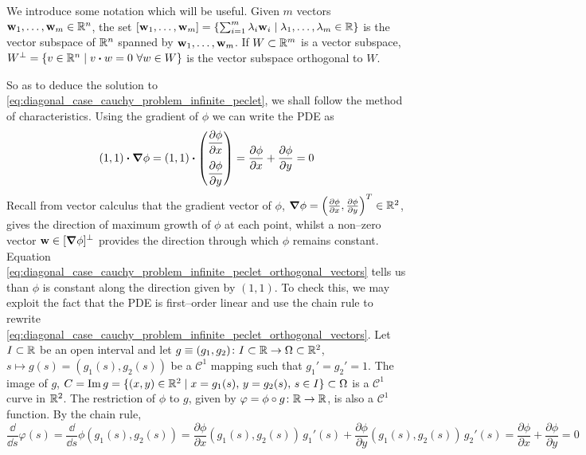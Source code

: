 We introduce some notation which will be useful. Given $m$ vectors $\vb{w}_1, \ldots, \vb{w}_m \in \mathbb{R}^n$, the set $[\vb{w}_1, \ldots, \vb{w}_m] = \{ \sum_{i=1}^m \lambda_i \vb{w}_i \mid \lambda_1, \ldots, \lambda_m \in \mathbb{R} \}$ is the vector subspace of $\mathbb{R}^n$ spanned by $\vb{w}_1, \ldots, \vb{w}_m$. If $W \subset \mathbb{R}^m$ is a vector subspace, $W^\perp = \{ v \in \real^n \mid v \vdot w = 0 \ \forall w \in W \}$ is the vector subspace orthogonal to $W$.

So as to deduce the solution to \eqref{eq:diagonal_case_cauchy_problem_infinite_peclet}, we shall follow the method of characteristics. Using the gradient of $\phi$ we can write the PDE as
\begin{equation} \label{eq:diagonal_case_cauchy_problem_infinite_peclet_orthogonal_vectors}
	\left( 1, 1 \right)
	\vdot
	\grad{\phi} = 
	\left( 1, 1 \right)
	\vdot
	\begin{pmatrix}
	\displaystyle\pdv{\phi}{x} \\[10pt] \displaystyle\pdv{\phi}{y}
	\end{pmatrix} = 
	\pdv{\phi}{x} + \pdv{\phi}{y} = 0
\end{equation}
Recall from vector calculus that the gradient vector of $\phi$, $\grad{\phi} = \left( \pdv{\phi}{x}, \pdv{\phi}{y} \right)^T \in \mathbb{R}^2$, gives the direction of maximum growth of $\phi$ at each point, whilst a non--zero vector $\vb{w} \in [\grad{\phi}]^\perp$ provides the direction through which $\phi$ remains constant. Equation \eqref{eq:diagonal_case_cauchy_problem_infinite_peclet_orthogonal_vectors} tells us than $\phi$ is constant along the direction given by $(1, 1)$. To check this, we may exploit the fact that the PDE is first--order linear and use the chain rule to rewrite \eqref{eq:diagonal_case_cauchy_problem_infinite_peclet_orthogonal_vectors}. Let $I \subset \mathbb{R}$ be an open interval and let $g \equiv (g_1, g_2) \colon I \subset \mathbb{R} \rightarrow \Omega \subset \mathbb{R}^2$, $s \mapsto g(s) = (g_1(s), g_2(s))$ be a $\mathcal{C}^1$ mapping such that $g_1' = g_2' = 1$. The image of $g$, $C = \operatorname{Im}{g} = \{ (x, y) \in \mathbb{R}^2 \mid x = g_1(s), \, y = g_2(s), \, s \in I \} \subset \Omega$ is a $\mathcal{C}^1$ curve in $\mathbb{R}^2$. The restriction of $\phi$ to $g$, given by $\varphi = \phi \circ g \colon \mathbb{R} \rightarrow \mathbb{R}$, is also a $\mathcal{C}^1$ function. By the chain rule,
\begin{equation} \label{eq:diagonal_case_cauchy_problem_infinite_peclet_chain_rule}
	\frac{\dd}{\dd{s}} \varphi(s) = 
	\frac{\dd}{\dd{s}} \phi(g_1(s), g_2(s)) = 
	\frac{\partial \phi}{\partial x} (g_1(s), g_2(s)) \, g_1'(s) + 
	\frac{\partial \phi}{\partial y} (g_1(s), g_2(s)) \, g_2'(s) =
	\frac{\partial \phi}{\partial x} + \frac{\partial \phi}{\partial y} = 0
\end{equation}
